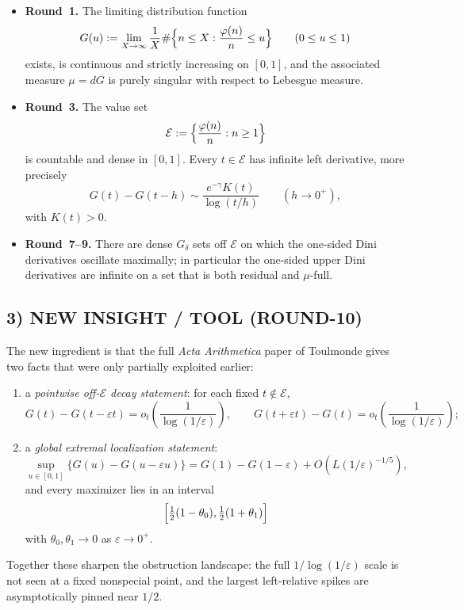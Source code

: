 \begin{itemize}
\item \textbf{Round~1.} The limiting distribution function
\[
G(u):=\lim_{X\to\infty}\frac1X\#\Bigl\{n\le X:\frac{\varphi(n)}n\le u\Bigr\}
\qquad(0\le u\le1)
\]
exists, is continuous and strictly increasing on $[0,1]$, and the associated measure $\mu=dG$ is purely singular with respect to Lebesgue measure.

\item \textbf{Round~3.} The value set
\[
\mathcal E:=\Bigl\{\frac{\varphi(n)}n:n\ge1\Bigr\}
\]
is countable and dense in $[0,1]$. Every $t\in\mathcal E$ has infinite left derivative, more precisely
\[
G(t)-G(t-h)\sim \frac{e^{-\gamma}K(t)}{\log(t/h)}
\qquad(h\to0^+),
\]
with $K(t)>0$.

\item \textbf{Round~7--9.} There are dense $G_\delta$ sets off $\mathcal E$ on which the one-sided Dini derivatives oscillate maximally; in particular the one-sided upper Dini derivatives are infinite on a set that is both residual and $\mu$-full.
\end{itemize}

\subsection{3) NEW INSIGHT / TOOL (ROUND-10)}

The new ingredient is that the full \emph{Acta Arithmetica} paper of Toulmonde gives two facts that were only partially exploited earlier:

\begin{enumerate}
\item a \emph{pointwise off-$\mathcal E$ decay statement}:
for each fixed $t\notin\mathcal E$,
\[
G(t)-G(t-\varepsilon t)=o_t\!\left(\frac1{\log(1/\varepsilon)}\right),
\qquad
G(t+\varepsilon t)-G(t)=o_t\!\left(\frac1{\log(1/\varepsilon)}\right);
\]
\item a \emph{global extremal localization statement}:
\[
\sup_{u\in[0,1]}\{G(u)-G(u-\varepsilon u)\}=G(1)-G(1-\varepsilon)+O(L(1/\varepsilon)^{-1/5}),
\]
and every maximizer lies in an interval
\[
\Bigl[\tfrac12(1-\theta_0),\tfrac12(1+\theta_1)\Bigr]
\]
with $\theta_0,\theta_1\to0$ as $\varepsilon\to0^+$.
\end{enumerate}

Together these sharpen the obstruction landscape: the full $1/\log(1/\varepsilon)$ scale is not seen at a fixed nonspecial point, and the largest left-relative spikes are asymptotically pinned near $1/2$.

